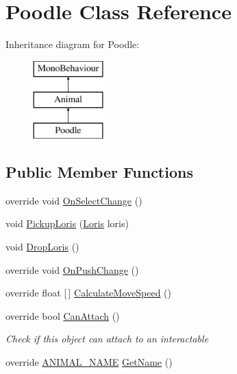 \hypertarget{class_poodle}{}\section{Poodle Class Reference}
\label{class_poodle}
Inheritance diagram for Poodle\+:\begin{figure}[H]
\begin{center}
\leavevmode
\includegraphics[height=3.000000cm]{class_poodle}
\end{center}
\end{figure}
\subsection*{Public Member Functions}
\begin{DoxyCompactItemize}
\item 
override void \mbox{\hyperlink{class_poodle_a57d0ab14cdd7ac693e010ca42fe52a6e}{On\+Select\+Change}} ()
\item 
void \mbox{\hyperlink{class_poodle_aea810427376cee41f4e99fc020c50d70}{Pickup\+Loris}} (\mbox{\hyperlink{class_loris}{Loris}} loris)
\item 
void \mbox{\hyperlink{class_poodle_a5e80c74cffb2d8235abf064eb729bfec}{Drop\+Loris}} ()
\item 
override void \mbox{\hyperlink{class_poodle_a5c281a37883590cab7ffd1bd361e4eac}{On\+Push\+Change}} ()
\item 
override float \mbox{[}$\,$\mbox{]} \mbox{\hyperlink{class_poodle_afded59108342a9d5c41b91305911752b}{Calculate\+Move\+Speed}} ()
\item 
override bool \mbox{\hyperlink{class_poodle_a1176b4dc1a07c88c75498f4fc80aba4a}{Can\+Attach}} ()
\begin{DoxyCompactList}\small\item\em Check if this object can attach to an interactable \end{DoxyCompactList}\item 
override \mbox{\hyperlink{_animal_8cs_a2fa5713399b84d1b88dae9196837af50}{A\+N\+I\+M\+A\+L\+\_\+\+N\+A\+ME}} \mbox{\hyperlink{class_poodle_a4aa6f80707dff1497fa00f855e28435e}{Get\+Name}} ()
\end{DoxyCompactItemize}

